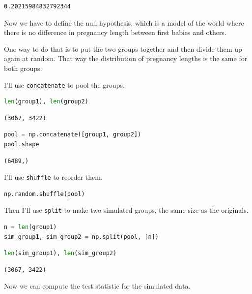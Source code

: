 \begin{lstlisting}[]
0.20215984832792344
\end{lstlisting}

Now we have to define the null hypothesis, which is a model of the world
where there is no difference in pregnancy length between first babies
and others.

One way to do that is to put the two groups together and then divide
them up again at random. That way the distribution of pregnancy lengths
is the same for both groups.

I'll use \passthrough{\lstinline!concatenate!} to pool the groups.

\begin{lstlisting}[language=Python]
len(group1), len(group2)
\end{lstlisting}

\begin{lstlisting}[]
(3067, 3422)
\end{lstlisting}

\begin{lstlisting}[language=Python]
pool = np.concatenate([group1, group2])
pool.shape
\end{lstlisting}

\begin{lstlisting}[]
(6489,)
\end{lstlisting}

I'll use \passthrough{\lstinline!shuffle!} to reorder them.

\begin{lstlisting}[language=Python]
np.random.shuffle(pool)
\end{lstlisting}

Then I'll use \passthrough{\lstinline!split!} to make two simulated
groups, the same size as the originals.

\begin{lstlisting}[language=Python]
n = len(group1)
sim_group1, sim_group2 = np.split(pool, [n])
\end{lstlisting}

\begin{lstlisting}[language=Python]
len(sim_group1), len(sim_group2)
\end{lstlisting}

\begin{lstlisting}[]
(3067, 3422)
\end{lstlisting}

Now we can compute the test statistic for the simulated data.

